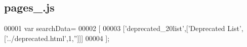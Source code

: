 \subsection{pages\+\_.\+js}
\label{pages__0_8js_source}

\begin{DoxyCode}
00001 var searchData=
00002 [
00003   [\textcolor{stringliteral}{'deprecated\_20list'},[\textcolor{stringliteral}{'Deprecated List'},[\textcolor{stringliteral}{'../deprecated.html'},1,\textcolor{stringliteral}{''}]]]
00004 ];
\end{DoxyCode}
